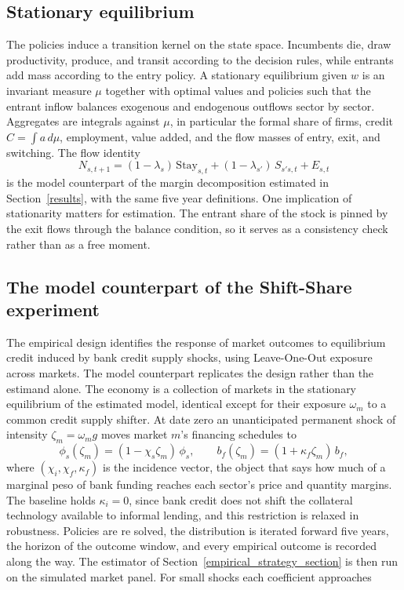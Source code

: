 \documentclass[12pt]{article}
\begin{document}
\subsection{Stationary equilibrium}

The policies induce a transition kernel on the state space. Incumbents die, draw productivity, produce, and transit according to the decision rules, while entrants add mass according to the entry policy. A stationary equilibrium given $w$ is an invariant measure $\mu$ together with optimal values and policies such that the entrant inflow balances exogenous and endogenous outflows sector by sector. Aggregates are integrals against $\mu$, in particular the formal share of firms, credit $C=\int a\,d\mu$, employment, value added, and the flow masses of entry, exit, and switching. The flow identity
\begin{equation}
  N_{s,t+1}
  =(1-\lambda_{s})\,\mathrm{Stay}_{s,t}
  +(1-\lambda_{s'})\,S_{s's,t}
  +E_{s,t}
  \label{eq:gen-flows}
\end{equation}
is the model counterpart of the margin decomposition estimated in Section~\ref{results}, with the same five year definitions. One implication of stationarity matters for estimation. The entrant share of the stock is pinned by the exit flows through the balance condition, so it serves as a consistency check rather than as a free moment.

\subsection{The model counterpart of the Shift-Share experiment}
\label{sec:gen-ssiv}

The empirical design identifies the response of market outcomes to equilibrium credit induced by bank credit supply shocks, using Leave-One-Out exposure across markets. The model counterpart replicates the design rather than the estimand alone. The economy is a collection of markets in the stationary equilibrium of the estimated model, identical except for their exposure $\omega_{m}$ to a common credit supply shifter. At date zero an unanticipated permanent shock of intensity $\zeta_{m}=\omega_{m}g$ moves market $m$'s financing schedules to
\begin{equation}
  \phi_{s}(\zeta_{m})=(1-\chi_{s}\zeta_{m})\,\phi_{s},
  \qquad
  b_{f}(\zeta_{m})=(1+\kappa_{f}\zeta_{m})\,b_{f},
  \label{eq:gen-shock}
\end{equation}
where $(\chi_{i},\chi_{f},\kappa_{f})$ is the incidence vector, the object that says how much of a marginal peso of bank funding reaches each sector's price and quantity margins. The baseline holds $\kappa_{i}=0$, since bank credit does not shift the collateral technology available to informal lending, and this restriction is relaxed in robustness. Policies are re solved, the distribution is iterated forward five years, the horizon of the outcome window, and every empirical outcome is recorded along the way. The estimator of Section~\ref{empirical_strategy_section} is then run on the simulated market panel. For small shocks each coefficient approaches
\end{document}

